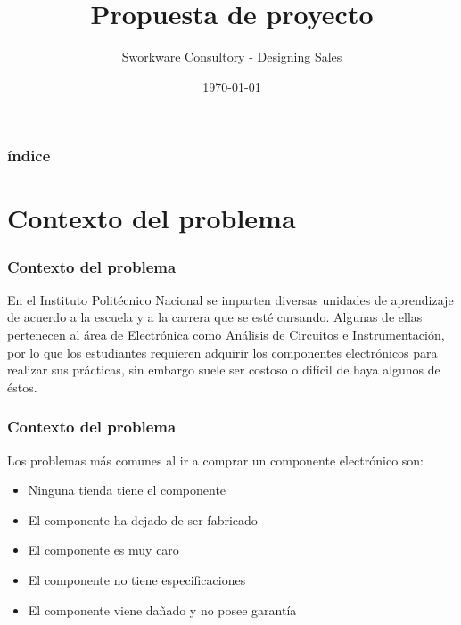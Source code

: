 \documentclass{beamer}
\title[]{Propuesta de proyecto} %
\author{Sworkware Consultory - Designing Sales} %
\institute[IPN] %
{
Escuela Superior de Cómputo \\ %
\medskip
\textit{gabriela.moreno.glez@gmail.com} %
}
\date{\today} %
\begin{document}
\begin{frame}
\titlepage %
\end{frame}

\begin{frame}
\frametitle{índice} %
\tableofcontents %
\end{frame}


\section{Contexto del problema} %

\begin{frame}
\frametitle{Contexto del problema}

En el Instituto Politécnico Nacional se imparten diversas unidades de aprendizaje de acuerdo a la escuela y a la carrera que se esté cursando. Algunas de ellas pertenecen al área de Electrónica como Análisis de Circuitos e Instrumentación, por lo que los estudiantes requieren adquirir los componentes electrónicos para realizar sus prácticas, sin embargo suele ser costoso o difícil de haya algunos de éstos.

\end{frame}


\begin{frame}
\frametitle{Contexto del problema}
Los problemas más comunes al ir a comprar un componente electrónico son:
\begin{itemize}
\item Ninguna tienda tiene el componente
\item El componente ha dejado de ser fabricado
\item El componente es muy caro
\item El componente no tiene especificaciones
\item El componente viene dañado y no posee garantía
\end{itemize}
\end{frame}
\end{document}
